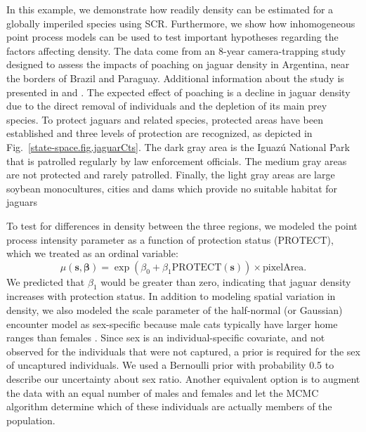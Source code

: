 In this example, we demonstrate how readily density can be estimated
for a globally imperiled species using SCR. Furthermore, we show how
inhomogeneous point process models can be used to test important
hypotheses regarding the factors affecting density.
The data come from an 8-year camera-trapping study designed to assess the impacts of poaching
on jaguar density in Argentina, near the borders of Brazil and
Paraguay. Additional information about the study is presented in
\citet{paviolo_etal:2008} and \citet{paviolo_etal:2009}.
The expected effect of poaching is a decline in jaguar
density due to the direct removal of individuals and the depletion of its
main prey species.
To protect jaguars and related species, protected areas have
been established and three levels of protection are
recognized, as depicted in Fig.~\ref{state-space.fig.jaguarCts}.
The dark gray %
area is the Iguaz\'{u} National Park that is patrolled regularly by law enforcement
officials. %
The medium gray areas are not protected and rarely patrolled. Finally, the
light gray areas are large soybean monocultures, cities and dams which
provide no suitable habitat for jaguars

To test for differences in
density between the three regions, we modeled the point process intensity parameter
as a function of protection status (PROTECT), which we treated as an
ordinal variable:
\[
\mu(\mathbf{s}, \bm{\beta}) = \exp(\beta_0 + \beta_1\text{PROTECT}(\mathbf{s}))\times \text{pixelArea}.
\]
We predicted that $\beta_1$
would be greater than zero,
indicating that jaguar density increases with protection status. In
addition to modeling spatial variation in density, we also modeled the
scale parameter of the half-normal (or Gaussian) encounter model as
sex-specific because male cats typically have larger home ranges than
females \citep{sollmann_etal:2011}. Since sex is an
individual-specific covariate, and not observed for the individuals
that were not captured, a prior is required for the sex of uncaptured
individuals. We used a Bernoulli prior with probability 0.5 to
describe our uncertainty about sex ratio. Another equivalent option is
to augment the data with an equal number of males and females and let
the MCMC algorithm determine which of these individuals are actually
members of the population.

